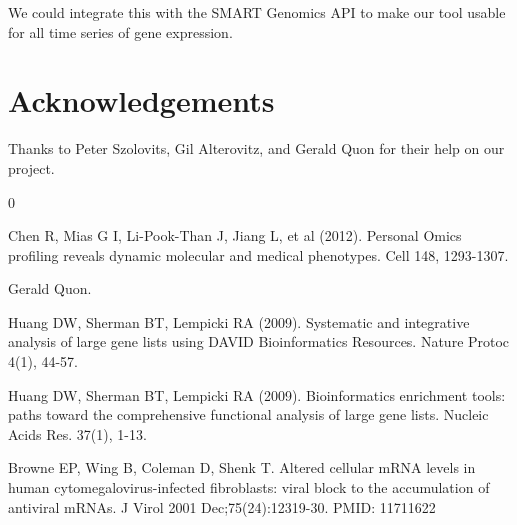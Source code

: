 \documentclass[aps,prd,final,onecolumn,a4paper,10pt]{revtex4}
\begin{document}
We could integrate this with the SMART Genomics API to make our tool usable for all time series of gene expression.

\section{Acknowledgements}
Thanks to Peter Szolovits, Gil Alterovitz, and Gerald Quon for their help on our project.

\begin{thebibliography} {0}

 Chen R, Mias G I, Li-Pook-Than J, Jiang L, et al (2012). Personal Omics profiling reveals dynamic molecular and medical phenotypes. Cell 148, 1293-1307.

 Gerald Quon.

 Huang DW, Sherman BT, Lempicki RA (2009). Systematic and integrative analysis of large gene lists using DAVID Bioinformatics Resources. Nature Protoc 4(1), 44-57.

 Huang DW, Sherman BT, Lempicki RA (2009). Bioinformatics enrichment tools: paths toward the comprehensive functional analysis of large gene lists. Nucleic Acids Res. 37(1), 1-13.

 Browne EP, Wing B, Coleman D, Shenk T. Altered cellular mRNA levels in human cytomegalovirus-infected fibroblasts: viral block to the accumulation of antiviral mRNAs. J Virol 2001 Dec;75(24):12319-30. PMID: 11711622


\end{thebibliography}
\end{document}
